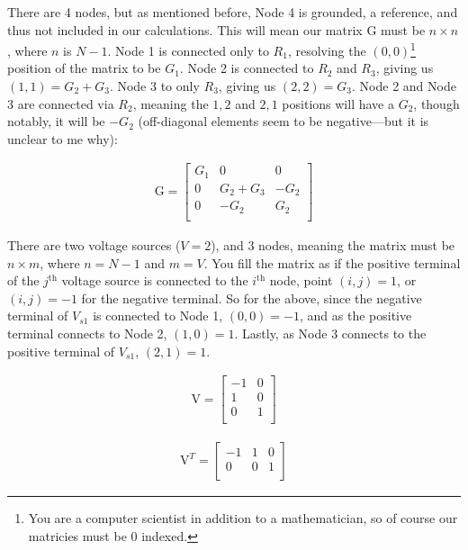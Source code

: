 There are 4 nodes, but as mentioned before, Node 4 is grounded, a reference, and thus not included in our calculations. This will mean our matrix G must be $n \times n$, where $n$ is $N - 1$. Node 1 is connected only to $R_1$, resolving the $(0,0)$\footnote{You are a computer scientist in addition to a mathematician, so of course our matricies must be 0 indexed.} position of the matrix to be $G_1$. Node 2 is connected to $R_2$ and $R_3$, giving us $(1,1) = G_2 + G_3$. Node 3 to only $R_3$, giving us $(2,2) = G_3$. Node 2 and Node 3 are connected via $R_2$, meaning the $1,2$ and $2,1$ positions will have a $G_2$, though notably, it will be $-G_2$ (off-diagonal elements seem to be negative---but it is unclear to me why):

\begin{align}
\mathrm{G} = 
\begin{bmatrix} 
G_1 & 0 & 0 \\
0 & G_2 + G_3 & -G_2 \\
0 & -G_2 & G_2 \\
\end{bmatrix}
\end{align}

There are two voltage sources ($V = 2$), and 3 nodes, meaning the matrix must be $n \times m$, where $n = N-1$ and $m = V$. You fill the matrix as if the positive terminal of the $j^{\mathrm{th}}$ voltage source is connected to the $i^{\mathrm{th}}$ node, point $(i,j) = 1$, or $(i,j) = -1$ for the negative terminal. So for the above, since the negative terminal of $V_{s1}$ is connected to Node 1, $(0,0) = -1$, and as the positive terminal connects to Node 2, $(1,0) = 1$. Lastly, as Node 3 connects to the positive terminal of $V_{s1}$, $(2,1) = 1$. 
\begin{multicols}{2}
\begin{align}
\mathrm{V} = 
\begin{bmatrix} 
-1 & 0 \\
1 & 0  \\
0 & 1  \\
\end{bmatrix}
\end{align}

\begin{align}
\mathrm{V}^T = 
\begin{bmatrix} 
-1 & 1 & 0 \\
0 & 0  & 1 \\
\end{bmatrix}
\end{align}
\end{multicols}

